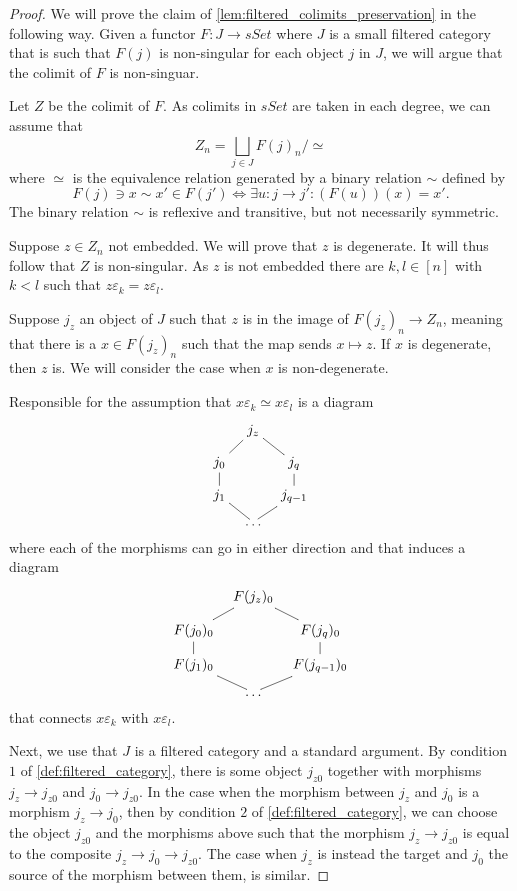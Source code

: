 \begin{proof}
We will prove the claim of \cref{lem:filtered_colimits_preservation} in the following way. Given a functor $F:J\to sSet$ where $J$ is a small filtered category that is such that $F(j)$ is non-singular for each object $j$ in $J$, we will argue that the colimit of $F$ is non-singuar.

Let $Z$ be the colimit of $F$. As colimits in $sSet$ are taken in each degree, we can assume that
\[Z_n=\bigsqcup _{j\in J}F(j)_n/\simeq\]
where $\simeq$ is the equivalence relation generated by a binary relation $\sim$ defined by
\[F(j)\ni x\sim x'\in F(j')\Leftrightarrow \exists u:j\to j':(F(u))(x)=x'.\]
The binary relation $\sim$ is reflexive and transitive, but not necessarily symmetric.

Suppose $z\in Z_n$ not embedded. We will prove that $z$ is degenerate. It will thus follow that $Z$ is non-singular. As $z$ is not embedded there are $k,l\in [n]$ with $k<l$ such that $z\varepsilon _k=z\varepsilon _l$.

Suppose $j_z$ an object of $J$ such that $z$ is in the image of $F(j_z)_n\to Z_n$, meaning that there is a $x\in F(j_z)_n$ such that the map sends $x\mapsto z$. If $x$ is degenerate, then $z$ is. We will consider the case when $x$ is non-degenerate.

Responsible for the assumption that $x\varepsilon _k\simeq x\varepsilon _l$ is a diagram
\begin{displaymath}
\xymatrix@=0.8em{
& j_z \ar@{-}[dr] \\
j_0 \ar@{-}[ur] && j_q \ar@{-}[d] \\
j_1 \ar@{-}[u] \ar@{-}[dr] && j_{q-1} \\
& \dots \ar@{-}[ur]
}
\end{displaymath}
where each of the morphisms can go in either direction and that induces a diagram
\begin{displaymath}
\xymatrix@=0.8em{
& F(j_z)_0 \ar@{-}[dr] \\
F(j_0)_0 \ar@{-}[ur] && F(j_q)_0 \ar@{-}[d] \\
F(j_1)_0 \ar@{-}[u] \ar@{-}[dr] && F(j_{q-1})_0 \\
& \dots \ar@{-}[ur]
}
\end{displaymath}
that connects $x\varepsilon _k$ with $x\varepsilon _l$.

Next, we use that $J$ is a filtered category and a standard argument. By condition $1$ of \cref{def:filtered_category}, there is some object $j_{z0}$ together with morphisms $j_z\to j_{z0}$ and $j_0\to j_{z0}$. In the case when the morphism between $j_z$ and $j_0$ is a morphism $j_z\to j_0$, then by condition $2$ of \cref{def:filtered_category}, we can choose the object $j_{z0}$ and the morphisms above such that the morphism $j_z\to j_{z0}$ is equal to the composite $j_z\to j_0\to j_{z0}$. The case when $j_z$ is instead the target and $j_0$ the source of the morphism between them, is similar.


\end{proof}
